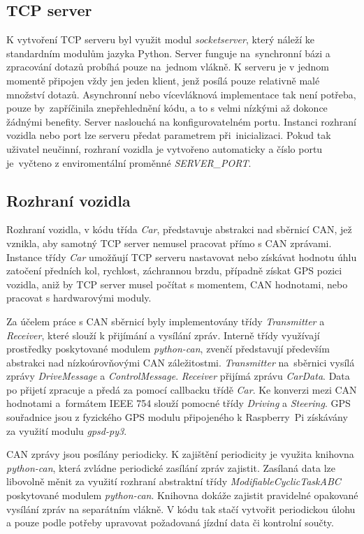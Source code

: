 \documentclass[czech, bachelor]{diploma}
\begin{document}
\subsection{TCP server}
K vytvoření TCP serveru byl využit modul \emph{socketserver}, který náleží ke standardním modulům jazyka Python. Server funguje
na~synchronní bázi a zpracování dotazů probíhá pouze na~jednom vlákně. K serveru je v jednom momentě připojen vždy jen jeden
klient, jenž posílá pouze relativně malé množství dotazů. Asynchronní nebo vícevláknová implementace tak není potřeba, pouze
by~zapříčinila znepřehlednění kódu, a to s velmi nízkými až dokonce žádnými benefity. Server naslouchá na konfigurovatelném portu.
Instanci rozhraní vozidla nebo port lze serveru předat parametrem při~inicializaci. Pokud tak uživatel neučinní, rozhraní vozidla
je vytvořeno automaticky a číslo portu je~vyčteno z enviromentální proměnné \emph{SERVER\_PORT}.

\subsection{Rozhraní vozidla}
Rozhraní vozidla, v kódu třída \emph{Car}, představuje abstrakci nad sběrnicí CAN, jež vznikla, aby samotný TCP server nemusel
pracovat přímo s CAN zprávami. Instance třídy \emph{Car} umožňují TCP serveru nastavovat nebo získávat hodnotu úhlu zatočení
předních kol, rychlost, záchrannou brzdu, případně získat GPS pozici vozidla, aniž by TCP server musel počítat s momentem, CAN
hodnotami, nebo pracovat s hardwarovými moduly.

Za účelem práce s CAN sběrnicí byly implementovány třídy \emph{Transmitter} a \emph{Receiver}, které slouží k přijímání a vysílání
zpráv. Interně třídy využívají prostředky poskytované modulem \emph{python-can}, zvenčí představují především abstrakci
nad nízkoúrovňovými CAN záležitostmi. \emph{Transmitter} na~sběrnici vysílá zprávy \emph{DriveMessage} a \emph{ControlMessage}.
\emph{Receiver} přijímá zprávu \emph{CarData}. Data po přijetí zpracuje a předá za pomocí callbacku třídě \emph{Car}. Ke konverzi
mezi CAN hodnotami a~formátem IEEE 754 slouží pomocné třídy \emph{Driving} a \emph{Steering}. GPS souřadnice jsou z fyzického GPS
modulu připojeného k Raspberry~Pi získávány za využití modulu \emph{gpsd-py3}.

CAN zprávy jsou posílány periodicky. K zajištění periodicity je využita knihovna \emph{python-can}, která zvládne periodické
zasílání zpráv zajistit. Zasílaná data lze libovolně měnit za využití rozhraní abstraktní třídy \emph{ModifiableCyclicTaskABC}
poskytované modulem \emph{python-can}. Knihovna dokáže zajistit pravidelné opakované vysílání zpráv na separátním vlákně. V kódu
tak stačí vytvořit periodickou úlohu a pouze podle potřeby upravovat požadovaná jízdní data či kontrolní součty.
\end{document}
